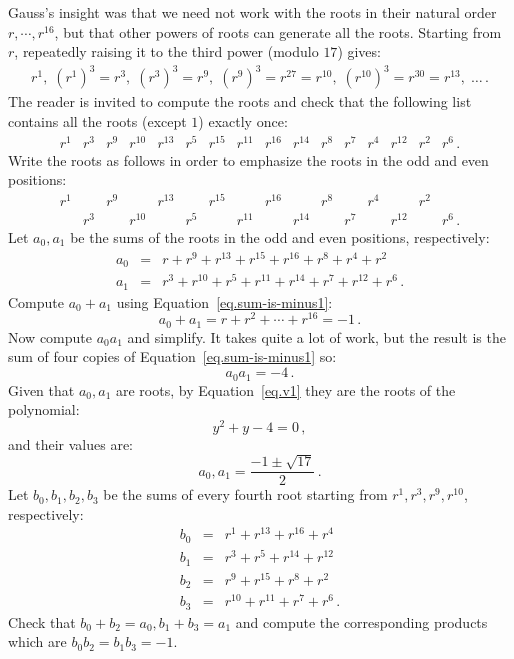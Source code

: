 \documentclass[a4paper,11pt]{article}
\begin{document}
Gauss's insight was that we need not work with the roots in their natural order $r,\cdots,r^{16}$, but that other powers of roots can generate all the roots. Starting from $r$, repeatedly raising it to the third power (modulo $17$) gives:
\[
\begin{array}{l}
r^1, \;(r^1)^3 =r^3,\; (r^3)^3=r^9,\; (r^9)^3=r^{27}=r^{10}, \; (r^{10})^3=r^{30}=r^{13}, \;\ldots \,.
\end{array}
\]
The reader is invited to compute the roots and check that the following list contains all the roots (except $1$) exactly once:
\[
\begin{array}{rrrrrrrrrrrrrrrr}
r^1& r^3& r^9& r^{10}& r^{13}& r^5& r^{15}& r^{11}& r^{16}& r^{14}& r^8& r^7& r^4& r^{12}& r^2& r^6\,.
\end{array}
\]
Write the roots as follows in order to emphasize the roots in the odd and even positions:
\[
\begin{array}{rrrrrrrrrrrrrrrr}
r^1 &&  r^9 &&  r^{13} && r^{15} &&  r^{16} && r^8 && r^4 && r^2\\\
&r^3&& r^{10}&& r^5&& r^{11}&& r^{14} &&  r^7&& r^{12}&& r^6\,.
\end{array}
\]
Let $a_0, a_1$ be the sums of the roots in the odd and even positions, respectively:
\begin{eqnarray*}
a_0&=&r + r^9 + r^{13} +r^{15} +r^{16} + r^8+r^4+r^2\\
a_1&=&r^3 + r^{10} + r^{5} +r^{11} +r^{14} + r^7+r^{12}+r^6\,.
\end{eqnarray*}
Compute $a_0+a_1$ using Equation~\ref{eq.sum-is-minus1}:
\[
a_0+a_1=r + r^2 + \cdots +r^{16}=-1\,.
\]
Now compute $a_0a_1$ and simplify. It takes quite a lot of work, but the result is the sum of four copies of Equation~\ref{eq.sum-is-minus1} so:
\[
a_0a_1=-4\,.
\]
Given that $a_0,a_1$ are roots, by Equation~\ref{eq.v1} they are the roots of the polynomial:
\[
y^2+y-4=0\,,
\]
and their values are:
\[
a_0, a_1 = \frac{-1\pm\sqrt{17}}{2}\,.
\]
Let $b_0,b_1,b_2,b_3$ be the sums of every fourth root starting from $r^1,r^3,r^9,r^{10}$, respectively:
\begin{eqnarray*}
b_0&=& r^1+ r^{13} + r^{16} + r^4\\
b_1&=& r^3+ r^{5} + r^{14} + r^{12}\\
b_2&=& r^9+ r^{15} + r^{8} + r^2\\
b_3&=& r^{10}+ r^{11} + r^{7} + r^6\,.
\end{eqnarray*}
Check that $b_0+b_2=a_0, b_1+b_3=a_1$ and compute the corresponding products which are $b_0b_2=b_1b_3=-1$.
\end{document}
